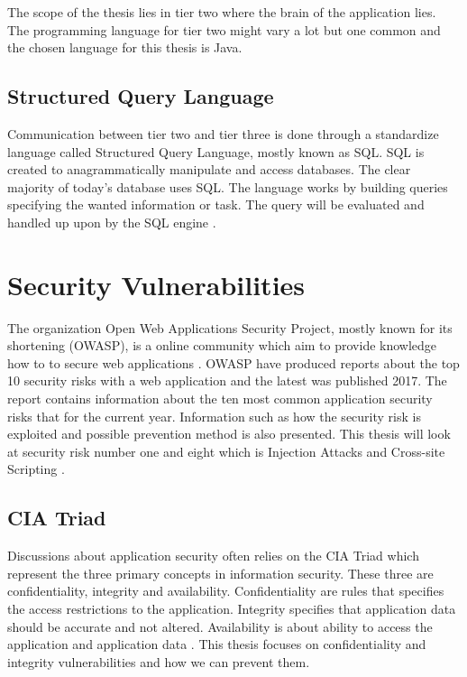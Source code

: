The scope of the thesis lies in tier two where the brain of the application lies. The programming language for tier two might vary a lot but one common and the chosen language for this thesis is Java.  


\subsection{Structured Query Language}
Communication between tier two and tier three is done through a standardize language called Structured Query Language, mostly known as SQL. SQL is created to anagrammatically manipulate and access databases. The clear majority of today's database uses SQL. The language works by building queries specifying the wanted information or task. The query will be evaluated and handled up upon by the SQL engine \parencite{DarieCristian2003TPGt}.


\section{Security Vulnerabilities}
\label{SecurityVulnerabilities}
The organization Open Web Applications Security Project, mostly known for its shortening (OWASP), is a online community which aim to provide knowledge how to to secure web applications \parencite{OpenWebApplicationSecurityProject}. OWASP have produced reports about the top 10 security risks with a web application and the latest was published 2017. The report contains information about the ten most common application security risks that for the current year. Information such as how the security risk is exploited and possible prevention method is also presented. This thesis will look at security risk number one and eight which is Injection Attacks and Cross-site Scripting \parencite{OWASP2017}.


\subsection{CIA Triad}
Discussions about application security often relies on the CIA Triad which represent the three primary concepts in information security. These three are confidentiality, integrity and availability. Confidentiality are rules that specifies the access restrictions to the application. Integrity specifies that application data should be accurate and not altered. Availability is about ability to access the application and application data \parencite{2014C1-W}. This thesis focuses on confidentiality and integrity vulnerabilities and how we can prevent them.

